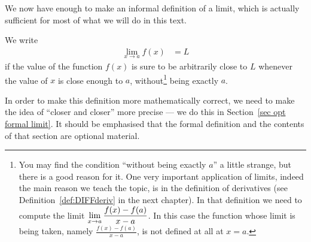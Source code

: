 We now have enough to make an informal definition of a limit, which is actually
sufficient for most of what we will do in this text.
\begin{defn}\label{def_1_3_1}
  We write
\begin{align*}
  \lim_{x \to a} f(x) &= L
\end{align*}
 if the value of the function $f(x)$ is sure to be arbitrarily close to $L$ whenever the value of $x$ is close enough to $a$, without\footnote{You may find the condition ``without  being exactly $a$'' a little strange, but there is a good reason for it. One very  important application of limits, indeed the main reason we teach the topic, is in the definition of derivatives (see Definition~\ref{def:DIFFderiv} in the next chapter).  In that definition we need to compute the limit $\displaystyle \lim_{x\rightarrow a}\frac{f(x)-f(a)}{x-a}$. In this case the function whose limit is being taken, namely  $\frac{f(x)-f(a)}{x-a}$, is not defined at all at $x=a$.} being exactly $a$.
\end{defn}
In order to make this definition more mathematically correct, we need to
make the idea of ``closer and closer'' more precise --- we do this in
Section~\ref{sec opt formal limit}. It should be emphasised that the
formal definition and the contents of that section are optional
material.

